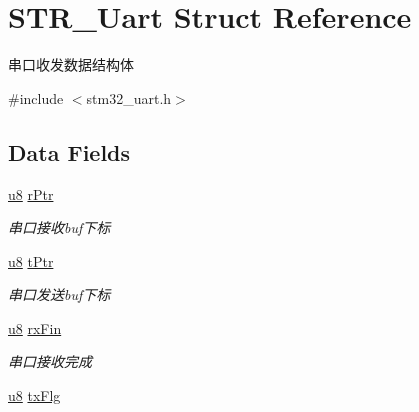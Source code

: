 \hypertarget{struct_s_t_r___uart}{\section{\-S\-T\-R\-\_\-\-Uart \-Struct \-Reference}
\label{struct_s_t_r___uart}
}


串口收发数据结构体  




{\ttfamily \#include $<$stm32\-\_\-uart.\-h$>$}

\subsection*{\-Data \-Fields}
\begin{DoxyCompactItemize}
\item 
\hypertarget{struct_s_t_r___uart_a2987b342e7f7de8cbcffd09792c3d742}{\hyperlink{group___b_s_p_gaed742c436da53c1080638ce6ef7d13de}{u8} \hyperlink{struct_s_t_r___uart_a2987b342e7f7de8cbcffd09792c3d742}{r\-Ptr}}\label{struct_s_t_r___uart_a2987b342e7f7de8cbcffd09792c3d742}

\begin{DoxyCompactList}\small\item\em 串口接收buf下标 \end{DoxyCompactList}\item 
\hypertarget{struct_s_t_r___uart_a099bdfb575f9a6ec65b1af9d006b468f}{\hyperlink{group___b_s_p_gaed742c436da53c1080638ce6ef7d13de}{u8} \hyperlink{struct_s_t_r___uart_a099bdfb575f9a6ec65b1af9d006b468f}{t\-Ptr}}\label{struct_s_t_r___uart_a099bdfb575f9a6ec65b1af9d006b468f}

\begin{DoxyCompactList}\small\item\em 串口发送buf下标 \end{DoxyCompactList}\item 
\hypertarget{struct_s_t_r___uart_a0418afde76b26a462c6ee884d220d09f}{\hyperlink{group___b_s_p_gaed742c436da53c1080638ce6ef7d13de}{u8} \hyperlink{struct_s_t_r___uart_a0418afde76b26a462c6ee884d220d09f}{rx\-Fin}}\label{struct_s_t_r___uart_a0418afde76b26a462c6ee884d220d09f}

\begin{DoxyCompactList}\small\item\em 串口接收完成 \end{DoxyCompactList}\item 
\hypertarget{struct_s_t_r___uart_a167da7e546ccd5e3efd16458d1aa9723}{\hyperlink{group___b_s_p_gaed742c436da53c1080638ce6ef7d13de}{u8} \hyperlink{struct_s_t_r___uart_a167da7e546ccd5e3efd16458d1aa9723}{tx\-Flg}}\label{struct_s_t_r___uart_a167da7e546ccd5e3efd16458d1aa9723}


\end{DoxyCompactItemize}
